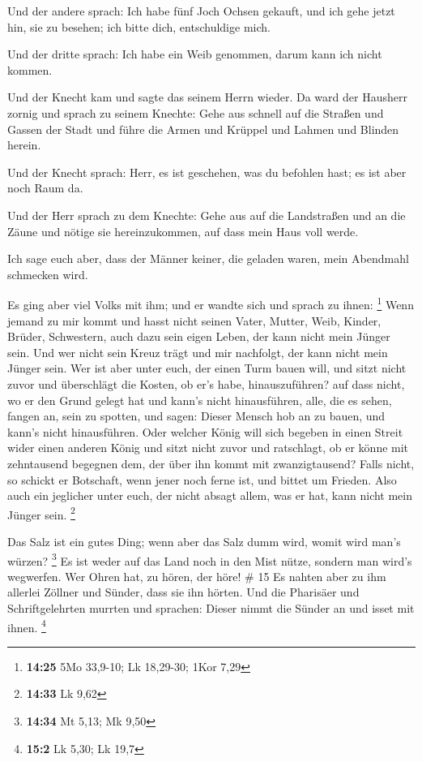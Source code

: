  Und der andere sprach: Ich habe fünf Joch Ochsen gekauft,
und ich gehe jetzt hin, sie zu besehen; ich bitte dich, entschuldige
mich.

 Und der dritte sprach: Ich habe ein Weib genommen, darum
kann ich nicht kommen.

 Und der Knecht kam und sagte das seinem Herrn wieder. Da
ward der Hausherr zornig und sprach zu seinem Knechte: Gehe aus schnell
auf die Straßen und Gassen der Stadt und führe die Armen und Krüppel und
Lahmen und Blinden herein.

 Und der Knecht sprach: Herr, es ist geschehen, was du
befohlen hast; es ist aber noch Raum da.

 Und der Herr sprach zu dem Knechte: Gehe aus auf die
Landstraßen und an die Zäune und nötige sie hereinzukommen, auf dass
mein Haus voll werde.

 Ich sage euch aber, dass der Männer keiner, die geladen
waren, mein Abendmahl schmecken wird.

 Es ging aber viel Volks mit ihm; und er wandte sich und
sprach zu ihnen: \footnote{\textbf{14:25} 5Mo 33,9-10; Lk 18,29-30; 1Kor
  7,29}  Wenn jemand zu mir kommt und hasst nicht seinen
Vater, Mutter, Weib, Kinder, Brüder, Schwestern, auch dazu sein eigen
Leben, der kann nicht mein Jünger sein.  Und wer nicht sein
Kreuz trägt und mir nachfolgt, der kann nicht mein Jünger sein.
 Wer ist aber unter euch, der einen Turm bauen will, und
sitzt nicht zuvor und überschlägt die Kosten, ob er's habe,
hinauszuführen?  auf dass nicht, wo er den Grund gelegt hat
und kann's nicht hinausführen, alle, die es sehen, fangen an, sein zu
spotten,  und sagen: Dieser Mensch hob an zu bauen, und
kann's nicht hinausführen.  Oder welcher König will sich
begeben in einen Streit wider einen anderen König und sitzt nicht zuvor
und ratschlagt, ob er könne mit zehntausend begegnen dem, der über ihn
kommt mit zwanzigtausend?  Falls nicht, so schickt er
Botschaft, wenn jener noch ferne ist, und bittet um Frieden.
 Also auch ein jeglicher unter euch, der nicht absagt
allem, was er hat, kann nicht mein Jünger sein. \footnote{\textbf{14:33}
  Lk 9,62}

 Das Salz ist ein gutes Ding; wenn aber das Salz dumm wird,
womit wird man's würzen? \footnote{\textbf{14:34} Mt 5,13; Mk 9,50}
 Es ist weder auf das Land noch in den Mist nütze, sondern
man wird's wegwerfen. Wer Ohren hat, zu hören, der höre! \# 15
 Es nahten aber zu ihm allerlei Zöllner und Sünder, dass sie
ihn hörten.  Und die Pharisäer und Schriftgelehrten murrten
und sprachen: Dieser nimmt die Sünder an und isset mit ihnen.
\footnote{\textbf{15:2} Lk 5,30; Lk 19,7}

